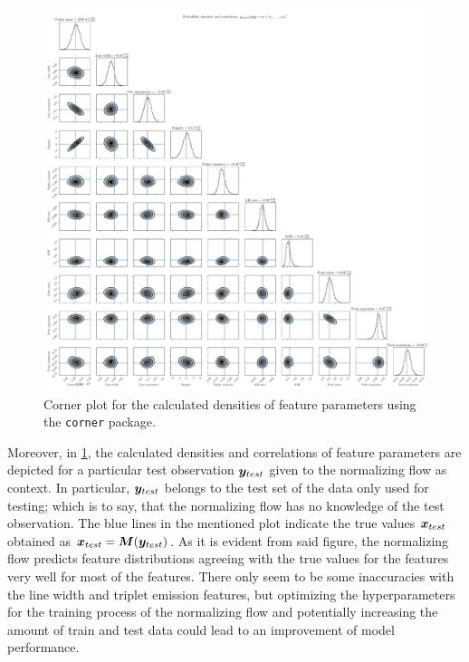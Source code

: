 \documentclass[a4paper,12pt]{report}
\begin{document}
\begin{figure}[h!]
\centering
\includegraphics[width=\textwidth]{figures/nf-feature-extraction-example-1-corner.pdf}
\cprotect\caption{Corner plot for the calculated densities of feature parameters using the \verb|corner| package.}
\label{fig:nf-feature-extraction-example-1-corner}
\end{figure}

Moreover, in \cref{fig:nf-feature-extraction-example-1-corner}, the calculated densities and correlations of feature parameters are depicted for a particular test observation $\bm{y}_{test}$ given to the normalizing flow as context. In particular, $\bm{y}_{test}$ belongs to the test set of the data only used for testing; which is to say, that the normalizing flow has no knowledge of the test observation. The blue lines in the mentioned plot indicate the true values $\bm{x}_{test}$ obtained as $\bm{x}_{test} = \bm{M}(\bm{y}_{test})$. As it is evident from said figure, the normalizing flow predicts feature distributions agreeing with the true values for the features very well for most of the features. There only seem to be some inaccuracies with the line width and triplet emission features, but optimizing the hyperparameters for the training process of the normalizing flow and potentially increasing the amount of train and test data could lead to an improvement of model performance.
\end{document}
